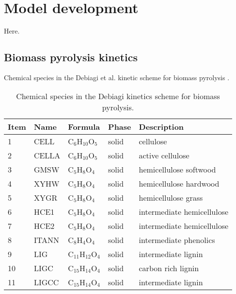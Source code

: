 
\section{Model development}

Here.

\subsection{Biomass pyrolysis kinetics}

Chemical species in the Debiagi et al. kinetic scheme for biomass pyrolysis \cite{Debiagi-2018}.

\begin{center}
    \footnotesize
    \begin{longtable}{lllll}
        \caption{Chemical species in the Debiagi kinetics scheme for biomass pyrolysis.}
        \label{tab:chem-species} \\
        \toprule
        Item & Name & Formula & Phase & Description \\
        \midrule
        1  & CELL           & C$_6$H$_{10}$O$_5$      & solid       & cellulose \\
        2  & CELLA          & C$_6$H$_{10}$O$_5$      & solid       & active cellulose \\
        3  & GMSW           & C$_5$H$_{8}$O$_4$       & solid       & hemicellulose softwood \\
        4  & XYHW           & C$_5$H$_{8}$O$_4$       & solid       & hemicellulose hardwood \\
        5  & XYGR           & C$_5$H$_{8}$O$_4$       & solid       & hemicellulose grass \\
        6  & HCE1           & C$_5$H$_{8}$O$_4$       & solid       & intermediate hemicellulose \\
        7  & HCE2           & C$_5$H$_{8}$O$_4$       & solid       & intermediate hemicellulose \\
        8  & ITANN          & C$_8$H$_{4}$O$_4$       & solid       & intermediate phenolics \\
        9  & LIG            & C$_{11}$H$_{12}$O$_4$   & solid       & intermediate lignin \\
        10 & LIGC           & C$_{15}$H$_{14}$O$_4$   & solid       & carbon rich lignin \\
        11 & LIGCC          & C$_{15}$H$_{14}$O$_4$   & solid       & intermediate lignin \\

\end{longtable}
\end{center}
